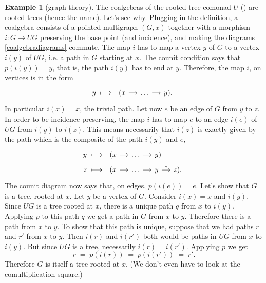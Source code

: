\documentclass[12pt,oneside]{scrbook}
\numberwithin{equation}{section}
\theoremstyle{plain}
\theoremstyle{definition}
\newtheorem{eg}[thm]{Example}
\newcommand{\ar}[2][]{\arrow{#2}{#1}}
\DeclareMathOperator{\1}{\mathbbm{1}}
\DeclareMathOperator{\2}{\mathbbm{2}}
\begin{document}
\begin{eg}[graph theory]\label{rootedtrees}
 The coalgebras of the rooted tree comonad $U$ () are rooted trees (hence the name). 
 Let's see why. Plugging in the definition, a coalgebra consists of a pointed multigraph $(G,x)$ together with a morphism $i:G\to UG$ preserving the base point (and incidence), and making the diagrams \eqref{coalgebradiagrams} commute. The map $i$ has to map a vertex $y$ of $G$ to a vertex $i(y)$ of $UG$, i.e. a path in $G$ starting at $x$. The counit condition says that $p(i(y))=y$, that is, the path $i(y)$ has to end at $y$. Therefore, the map $i$, on vertices is in the form 
 $$
 y \;\longmapsto\; 
 \begin{tikzcd}[sep=small]
  (x \ar{r} &\dots \ar{r} & y ) .
 \end{tikzcd}
 $$
 In particular $i(x)=x$, the trivial path.
 Let now $e$ be an edge of $G$ from $y$ to $z$. In order to be incidence-preserving, the map $i$ has to map $e$ to an edge $i(e)$ of $UG$ from $i(y)$ to $i(z)$. This means necessarily that $i(z)$ is exactly given by the path which is the composite of the path $i(y)$ and $e$,
 \begin{align*}
 y \;&\longmapsto\; 
 \begin{tikzcd}[ampersand replacement=\&, sep=small]
  (x \ar{r} \&\dots \ar{r} \& y )   
 \end{tikzcd} \\
   z \;&\longmapsto\; 
 \begin{tikzcd}[ampersand replacement=\&, sep=small]
  (x \ar{r} \&\dots \ar{r} \& y \ar{r}{e} \& z ) .   
 \end{tikzcd}
 \end{align*}
 The counit diagram now says that, on edges, $p(i(e))=e$.
 Let's show that $G$ is a tree, rooted at $x$. Let $y$ be a vertex of $G$. Consider $i(x)=x$ and $i(y)$. Since $UG$ is a tree rooted at $x$, there is a unique path $q$ from $x$ to $i(y)$. Applying $p$ to this path $q$ we get a path in $G$ from $x$ to $y$. Therefore there is a path from $x$ to $y$. To show that this path is unique, suppose that we had paths $r$ and $r'$ from $x$ to $y$. 
 Then $i(r)$ and $i(r')$ both would be paths in $UG$ from $x$ to $i(y)$. But since $UG$ is a tree, necessarily $i(r)=i(r')$. Applying $p$ we get 
 $$
 r \;=\; p(i(r)) \;=\; p(i(r')) \;=\; r' .
 $$
 Therefore $G$ is itself a tree rooted at $x$. 
 (We don't even have to look at the comultiplication square.)
 

\end{eg}
\end{document}
